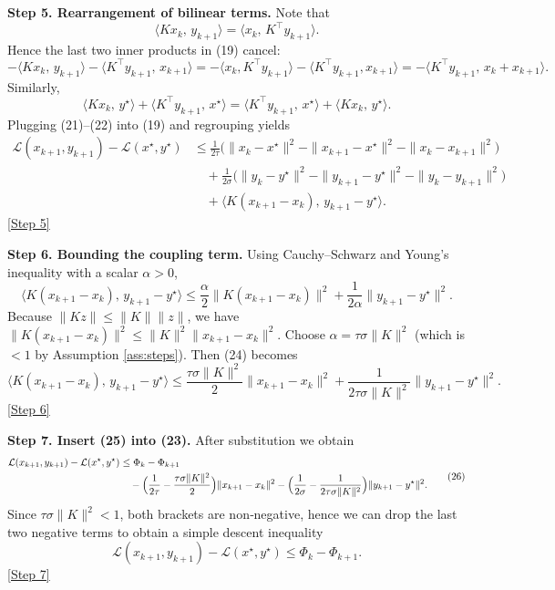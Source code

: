 \documentclass{article}
\begin{document}
\medskip
\noindent\textbf{Step 5. Rearrangement of bilinear terms.}  
Note that 
\[
\langle Kx_{k},\,y_{k+1}\rangle
= \langle x_{k},\,K^{\!\top}y_{k+1}\rangle .
\tag{20}
\]
Hence the last two inner products in (19) cancel:
\[
- \langle Kx_{k},\,y_{k+1}\rangle
- \langle K^{\!\top}y_{k+1},\,x_{k+1}\rangle
= -\langle x_{k},K^{\!\top}y_{k+1}\rangle
-\langle K^{\!\top}y_{k+1},x_{k+1}\rangle
= -\langle K^{\!\top}y_{k+1},\,x_{k}+x_{k+1}\rangle .
\tag{21}
\]
Similarly,
\[
\langle Kx_{k},\,y^{\star}\rangle
+ \langle K^{\!\top}y_{k+1},\,x^{\star}\rangle
= \langle K^{\!\top}y_{k+1},\,x^{\star}\rangle
+ \langle Kx_{k},\,y^{\star}\rangle .
\tag{22}
\]
Plugging (21)–(22) into (19) and regrouping yields
\[
\begin{aligned}
\mathcal L(x_{k+1},y_{k+1})-\mathcal L(x^{\star},y^{\star})
&\le
\frac{1}{2\tau}\bigl(\|x_{k}-x^{\star}\|^{2}-\|x_{k+1}-x^{\star}\|^{2}-\|x_{k}-x_{k+1}\|^{2}\bigr)\\
&\quad
+\frac{1}{2\sigma}\bigl(\|y_{k}-y^{\star}\|^{2}-\|y_{k+1}-y^{\star}\|^{2}-\|y_{k}-y_{k+1}\|^{2}\bigr)\\
&\quad
+\langle K(x_{k+1}-x_{k}),\,y_{k+1}-y^{\star}\rangle .
\end{aligned}
\tag{23}
\]
\noindent\underline{[Step 5]}

\medskip
\noindent\textbf{Step 6. Bounding the coupling term.}  
Using Cauchy–Schwarz and Young’s inequality with a scalar $\alpha>0$,
\[
\langle K(x_{k+1}-x_{k}),\,y_{k+1}-y^{\star}\rangle
\le
\frac{\alpha}{2}\|K(x_{k+1}-x_{k})\|^{2}
+\frac{1}{2\alpha}\|y_{k+1}-y^{\star}\|^{2}.
\tag{24}
\]
Because $\|Kz\|\le \|K\|\|z\|$, we have $\|K(x_{k+1}-x_{k})\|^{2}\le \|K\|^{2}\|x_{k+1}-x_{k}\|^{2}$.  
Choose $\alpha = \tau\sigma\|K\|^{2}$ (which is $<1$ by Assumption \ref{ass:steps}). Then (24) becomes
\[
\langle K(x_{k+1}-x_{k}),\,y_{k+1}-y^{\star}\rangle
\le
\frac{\tau\sigma\|K\|^{2}}{2}\|x_{k+1}-x_{k}\|^{2}
+\frac{1}{2\tau\sigma\|K\|^{2}}\|y_{k+1}-y^{\star}\|^{2}.
\tag{25}
\]
\noindent\underline{[Step 6]}

\medskip
\noindent\textbf{Step 7. Insert (25) into (23).}  
After substitution we obtain
\[
\begin{aligned}
\mathcal L(x_{k+1},y_{k+1})-\mathcal L(x^{\star},y^{\star})
&\le
\Phi_{k}-\Phi_{k+1}\\
&\quad
-\Bigl(\frac{1}{2\tau}-\frac{\tau\sigma\|K\|^{2}}{2}\Bigr)\|x_{k+1}-x_{k}\|^{2}
-\Bigl(\frac{1}{2\sigma}-\frac{1}{2\tau\sigma\|K\|^{2}}\Bigr)\|y_{k+1}-y^{\star}\|^{2}.
\end{aligned}
\tag{26}
\]
Since $\tau\sigma\|K\|^{2}<1$, both brackets are non‑negative, hence we can drop the last two negative terms to obtain a simple descent inequality
\[
\mathcal L(x_{k+1},y_{k+1})-\mathcal L(x^{\star},y^{\star})
\le \Phi_{k}-\Phi_{k+1}.
\tag{27}
\]
\noindent\underline{[Step 7]}
\end{document}
